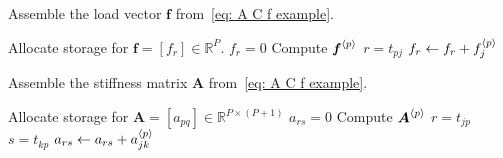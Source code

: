\begin{algorithm}
\caption{Assemble the load vector $\boldsymbol{f}$
from~\eqref{eq: A C f example}.}
\label{alg: assemble f piecewise linear}
\begin{algorithmic}
\State Allocate storage for $\boldsymbol{f}=[f_r]\in\mathbb{R}^P$.
    \State $f_r=0$
\EndFor
{}
    \State Compute $\boldsymbol{f}^{\langle p\rangle}$
        \State $r=t_{pj}$
            \State $f_r\gets f_r+f^{\langle p\rangle}_j$
        \EndIf
    \EndFor
\EndFor
\end{algorithmic}
\end{algorithm}

\begin{algorithm}
\caption{Assemble the stiffness matrix $\boldsymbol{A}$
from~\eqref{eq: A C f example}.}
\label{alg: assemble A piecewise linear}
\begin{algorithmic}
\State Allocate storage for
$\boldsymbol{A}=[a_{pq}]\in\mathbb{R}^{P\times(P+1)}$
        \State $a_{rs}=0$
    \EndFor
\EndFor
{}
    \State Compute $\boldsymbol{A}^{\langle p\rangle}$
        \State $r=t_{jp}$
                \State $s=t_{kp}$
                \State $a_{rs}\gets a_{rs}+a^{\langle p\rangle}_{jk}$
            \EndFor
        \EndIf
    \EndFor
\EndFor
\end{algorithmic}
\end{algorithm}

